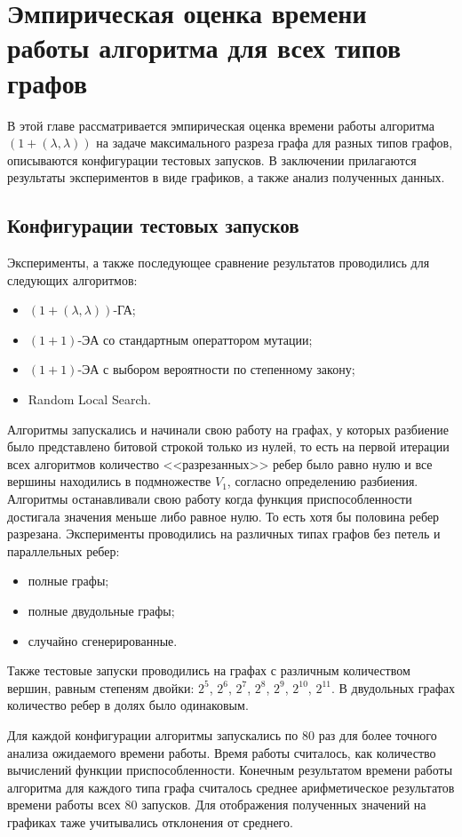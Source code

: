 \documentclass[times]{itmo-student-thesis}
\newcommand{\alglambda}{${(1 + (\lambda , \lambda))}$\xspace}
\newcommand{\alglambdaf}{${(1 + (\lambda , \lambda))}$-ГА\xspace}
\newcommand{\oea}{\mbox{$(1 + 1)$-ЭА}\xspace}
\begin{document}
\chapter{Эмпирическая оценка времени работы алгоритма для всех типов графов}
В этой главе рассматривается эмпирическая оценка времени работы алгоритма \alglambda на задаче максимального разреза графа для разных типов графов, описываются конфигурации тестовых запусков. В заключении прилагаются результаты экспериментов в виде графиков, а также анализ полученных данных.

\section{Конфигурации тестовых запусков}
Эксперименты, а также последующее сравнение результатов проводились для следующих алгоритмов:
\begin{itemize}
 \item \alglambdaf;
 \item \oea со стандартным операттором мутации;
 \item \oea с выбором вероятности по степенному закону;
 \item Random Local Search.
\end{itemize}
Алгоритмы запускались и начинали свою работу на графах, у которых разбиение было представлено битовой строкой только из нулей, то есть на первой итерации всех алгоритмов количество <<разрезанных>> ребер было равно нулю и все вершины находились в подмножестве $V_1$, согласно определению разбиения. Алгоритмы останавливали свою работу когда функция приспособленности достигала значения меньше либо равное нулю. То есть хотя бы половина ребер разрезана.
Эксперименты проводились на различных типах графов без петель и параллельных ребер:
\begin{itemize}
 \item полные графы;
 \item полные двудольные графы;
 \item случайно сгенерированные.
\end{itemize}
Также тестовые запуски проводились на графах с различным количеством вершин, равным степеням двойки: $2^5$, $2^6$, $2^7$, $2^8$, $2^9$, $2^{10}$, $2^{11}$.
В двудольных графах количество ребер в долях было одинаковым.

Для каждой конфигурации алгоритмы запускались по 80 раз для более точного анализа ожидаемого времени работы. Время работы считалось, как количество вычислений функции приспособленности. Конечным результатом времени работы алгоритма для каждого типа графа считалось среднее арифметическое результатов времени работы всех 80 запусков. Для отображения полученных значений на графиках таже учитывались отклонения от среднего.
\end{document}
